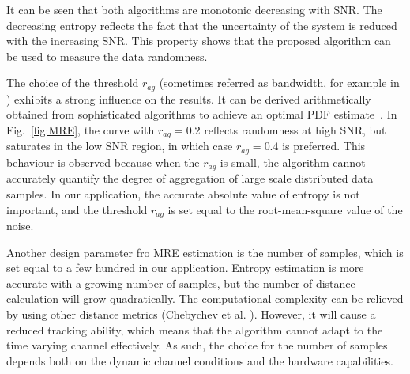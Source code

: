 \documentclass[journal,comsoc]{IEEEtran}
\begin{document}
It can be seen that both algorithms are monotonic decreasing with SNR.
The decreasing entropy reflects the fact that the uncertainty of the system is reduced with the increasing SNR.
This property shows that the proposed algorithm can be used to measure the data randomness.

The choice of the threshold \(r_{ag}\) (sometimes referred as bandwidth, for example in \cite{Botev2010KernelDiffusion}) exhibits a strong influence on the results.
It can be derived arithmetically 
obtained from sophisticated algorithms to achieve an optimal PDF estimate~\cite{Botev2010KernelDiffusion}.
In Fig.~\ref{fig:MRE}, the curve with \(r_{ag}=0.2\) reflects randomness at high SNR, but saturates in the low SNR region, in which case \(r_{ag}=0.4\) is preferred.
This behaviour is observed because when the \(r_{ag}\) is small, the algorithm cannot accurately quantify the degree of aggregation of large scale distributed data samples.
In our application, the accurate absolute value of entropy is not important, and the threshold $r_{ag}$ is set equal to the root-mean-square value of the noise.

Another design parameter fro MRE estimation is the number of samples, which is set equal to a few hundred in our application.
Entropy estimation is more accurate with a growing number of samples, but the number of distance calculation will grow quadratically.
The computational complexity can be relieved by 
using other distance metrics (Chebychev et al. \cite{Cha2007}).
However, it will cause a reduced tracking ability, which means that the algorithm cannot adapt to the time varying channel effectively.
As such, the choice for the number of samples depends both on the dynamic channel conditions and the hardware capabilities.
% 
% 
\end{document}
